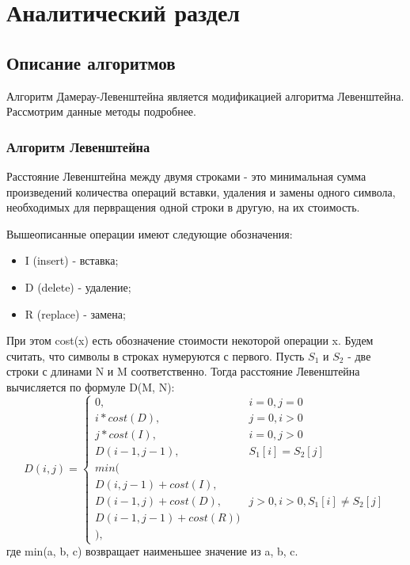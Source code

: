\chapter{Аналитический раздел}
\label{cha:analysis}

\section{Описание алгоритмов}

Алгоритм Дамерау-Левенштейна является модификацией алгоритма Левенштейна. Рассмотрим данные методы подробнее.

\subsection{Алгоритм Левенштейна}

Расстояние Левенштейна между двумя строками - это минимальная сумма произведений количества операций вставки, удаления и замены одного символа, необходимых для первращения одной строки в другую, на их стоимость.

Вышеописанные операции имеют следующие обозначения:
\begin{itemize}
    \item I (insert) - вставка;
    \item D (delete) - удаление;
    \item R (replace) - замена;
\end{itemize}

При этом cost(x) есть обозначение стоимости некоторой операции x. Будем считать, что символы в строках нумеруются с первого. Пусть $S_{1}$ и $S_{2}$ - две строки с длинами N и M соответственно. Тогда расстояние Левенштейна вычисляется по формуле D(M, N):
\begin{displaymath}
D(i,j) = \left\{ \begin{array}{ll}
 0, & \textrm{$i = 0, j = 0$}\\
 i * cost(D), & \textrm{$j = 0, i > 0$}\\
 j * cost(I), & \textrm{$i = 0, j > 0$}\\
 D(i - 1, j - 1), & \textrm{$S_{1}[i] = S_{2}[j]$}\\
min(\\
D(i,j-1) + cost(I),\\
D(i-1, j) + cost(D), &\textrm{$j > 0, i > 0, S_1[i] \neq S_2[j]$}\\
D(i-1, j-1) + cost(R))\\
),
  \end{array} \right.
\end{displaymath}
где min(a, b, c) возвращает наименьшее значение из a, b, c.

